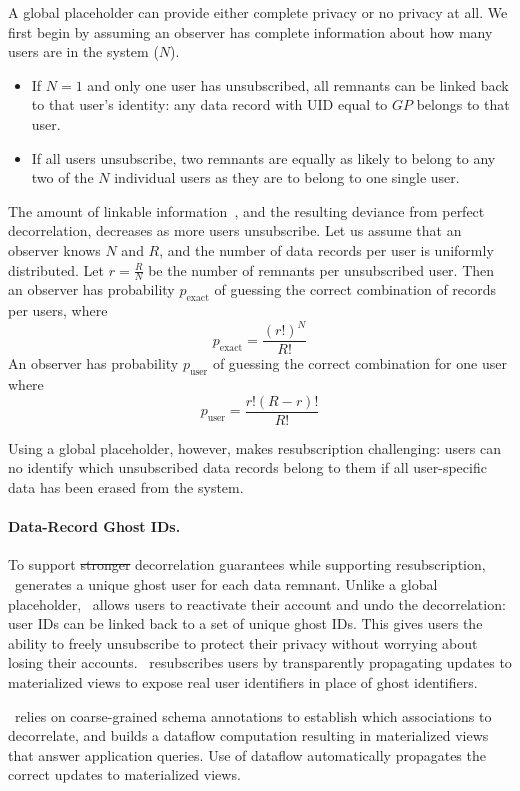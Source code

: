 A global placeholder can provide either complete privacy or no privacy at all. We first begin by
assuming an observer has complete information about how many users are in the system ($N$).
\begin{itemize}
    \item If $N=1$ and only one user has unsubscribed, all remnants can be linked back to that user's
        identity: any data record with UID equal to $GP$ belongs to that user.
    \item If all users unsubscribe, two remnants are equally as likely to belong
        to any two of the $N$ individual users as they are to belong to one single user. 
\end{itemize}
The amount of linkable information~, and the resulting deviance from
perfect decorrelation, decreases as more users unsubscribe.
Let us assume that an observer knows $N$ and $R$, and the number of data records per user is
uniformly distributed. Let $r = \frac{R}{N}$ be the number of remnants per unsubscribed user. 
Then an observer has probability $p_{\text{exact}}$ of guessing the correct combination of
records per users, where  
$$p_{\text{exact}} = \frac{(r!)^N}{R!}$$
An observer has probability $p_{\text{user}}$ of guessing the correct combination for one user where 
$$p_{\text{user}} = \frac{r!(R-r)!}{R!}$$

Using a global placeholder, however, makes resubscription challenging: users can no identify which
unsubscribed data records belong to them if all user-specific data has been erased from the
system. 

\paragraph{Data-Record Ghost IDs.}
To support \sout{stronger} decorrelation guarantees while supporting resubscription,
\sys~generates a unique ghost user for each data remnant. 
Unlike a global placeholder, \sys~allows users to reactivate their account and undo
the decorrelation: user IDs can be linked back to a set of unique ghost IDs. 
This gives users the ability to freely unsubscribe to protect their privacy
without worrying about losing their accounts. \sys~resubscribes users by transparently propagating
updates to materialized views to expose real user identifiers in place of ghost identifiers. 

\sys~relies on coarse-grained schema annotations to establish which associations to decorrelate, and
builds a dataflow computation resulting in materialized views that answer application queries. Use
of dataflow automatically propagates the correct updates to materialized views.

